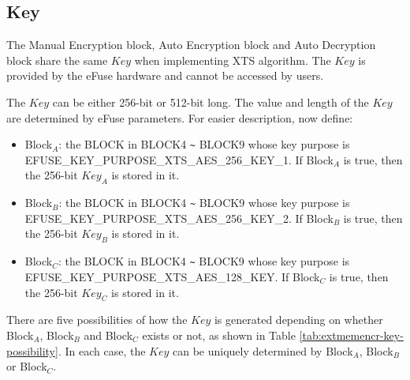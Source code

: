 \documentclass[main\_\_EN.tex]{subfiles}
\begin{document}
\subsection{Key}
\label{sec:extmemncr-key}

The Manual Encryption block, Auto Encryption block and Auto Decryption block share the same \begin{math}Key\end{math} when implementing XTS algorithm. The \begin{math}Key\end{math} is provided by the eFuse hardware and cannot be accessed by users.

The \begin{math}Key\end{math} can be either 256-bit or 512-bit long. The value and length of the \begin{math}Key\end{math} are determined by eFuse parameters. For easier description, now define:
\begin{itemize}
    \item Block$_A$: the BLOCK in BLOCK4 \verb+~+ BLOCK9 whose key purpose is EFUSE\_KEY\_PURPOSE\_XTS\_AES\_256\_KEY\_1. If Block$_A$ is true, then the 256-bit \begin{math}Key_{A}\end{math} is stored in it.

    \item Block$_B$: the BLOCK in BLOCK4 \verb+~+ BLOCK9 whose key purpose is EFUSE\_KEY\_PURPOSE\_XTS\_AES\_256\_KEY\_2. If Block$_B$ is true, then the 256-bit \begin{math}Key_{B}\end{math} is stored in it.

    \item Block$_C$: the BLOCK in BLOCK4 \verb+~+ BLOCK9 whose key purpose is EFUSE\_KEY\_PURPOSE\_XTS\_AES\_128\_KEY. If Block$_C$ is true, then the 256-bit \begin{math}Key_{C}\end{math} is stored in it.
\end{itemize}

There are five possibilities of how the \begin{math}Key\end{math} is generated depending on whether Block$_A$, Block$_B$ and Block$_C$ exists or not, as shown in Table \ref{tab:extmemencr-key-possibility}. In each case, the \begin{math}Key\end{math} can be uniquely determined by Block$_A$, Block$_B$ or Block$_C$.
\end{document}
